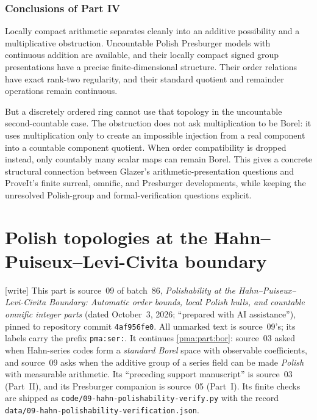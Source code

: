 \documentclass[11pt]{article}
\numberwithin{equation}{section}
\theoremstyle{definition}
\theoremstyle{remark}
\newcommand{\writetag}{\textup{\textsf{\small[write]}}}
\newcommand{\fn}[1]{\nolinkurl{#1}}
\begin{document}
\section{Conclusions of Part IV}

Locally compact arithmetic separates cleanly into an additive possibility
and a multiplicative obstruction. Uncountable Polish Presburger models
with continuous addition are available, and their locally compact signed
group presentations have a precise finite-dimensional structure. Their
order relations have exact rank-two regularity, and their standard
quotient and remainder operations remain continuous.

But a discretely ordered ring cannot use that topology in the uncountable
second-countable case. The obstruction does not ask multiplication to be
Borel: it uses multiplication only to create an impossible injection
from a real component into a countable component quotient. When order
compatibility is dropped instead, only countably many scalar maps can
remain Borel. This gives a concrete structural connection between
Glazer's arithmetic-presentation questions and ProveIt's finite surreal,
omnific, and Presburger developments, while keeping the unresolved
Polish-group and formal-verification questions explicit.

\part{Polish topologies at the Hahn--Puiseux--Levi-Civita boundary}\label{pma:part:ser}

\noindent\writetag{} This part is source~09 of batch~86,
\emph{Polishability at the Hahn--Puiseux--Levi-Civita Boundary: Automatic
order bounds, local Polish hulls, and countable omnific integer parts}
(dated October~3, 2026; ``prepared with AI assistance''), pinned to
repository commit \texttt{4af956fe0}. All unmarked text is source~09's; its
labels carry the prefix \texttt{pma:ser:}. It continues \cref{pma:part:bor}:
source~03 asked when Hahn-series codes form a \emph{standard Borel} space with
observable coefficients, and source~09 asks when the additive group of a
series field can be made \emph{Polish} with measurable arithmetic. Its
``preceding support manuscript'' \cite{s09:PriorSupport} is source~03
(Part~II), and its Presburger companion \cite{s09:PriorPresburger} is
source~05 (Part~I). Its finite checks are shipped as
\fn{code/09-hahn-polishability-verify.py} with the record
\fn{data/09-hahn-polishability-verification.json}.
\end{document}
